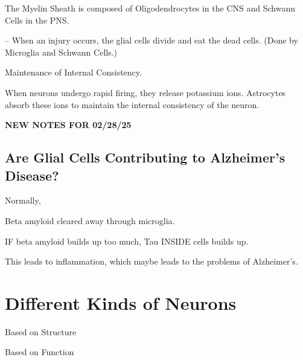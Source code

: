 \begin{coloredlist}
\begin{coloredlist}
\begin{coloredlist}
        \end{coloredlist}
        \item The Myelin Sheath is composed of Oligodendrocytes in the CNS and Schwann Cells in the PNS.
        \item {} -- When an injury occurs, the glial cells divide and eat the dead cells. (Done by Microglia and Schwann Cells.)
        \item Maintenance of Internal Consistency.
        \begin{coloredlist}
            \item When neurons undergo rapid firing, they release potassium ions. Astrocytes absorb these ions to maintain the internal consistency of the neuron.
        \end{coloredlist}
    \end{coloredlist}
\end{coloredlist}

\begin{center}
    \textbf{NEW NOTES FOR 02/28/25} \\
    \hrulefill
\end{center}

\subsection{Are Glial Cells Contributing to Alzheimer's Disease?}

\begin{coloredlist}
    \item Normally,
    \begin{coloredlist}
        \item Beta amyloid cleared away through microglia.
    \end{coloredlist}
    \item IF beta amyloid builds up too much, Tau INSIDE cells builds up.
    \item This leads to inflammation, which maybe leads to the problems of Alzheimer's.
\end{coloredlist}

\section{Different Kinds of Neurons}

\begin{coloredlist}
    \item Based on Structure
    \item Based on Function
\end{coloredlist}

